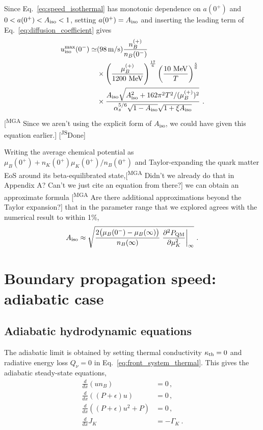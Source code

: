 \documentclass[10pt,superscriptaddress,
amsmath,aps,prc,twocolumn,nofootinbib,floatfix]{revtex4-1}
\newcommand{\mga}[1]{{\color[rgb]{0.6,0,0}#1}}
\newcommand{\mgacom}[1]{\textsf{\color[rgb]{0.8,0,0}[\textsuperscript{MGA} #1]}}
\newcommand{\JS}[1]{{\color{violet}#1}}
\newcommand{\JScom}[1]{\textsf{\color{violet} [\textsuperscript{JS}#1]}}
\newcommand{\eps}{\epsilon}
\begin{document}
\JS{Since Eq.~\eqref{eq:speed_isothermal} has monotonic dependence on $a(0^+)$ and $0<a(0^+)<A_{\rm iso}<1$, setting $a(0^+)=A_{\rm iso}$ and inserting the leading term of Eq.~\eqref{eq:diffusion_coefficient} gives}
\begin{equation}
\begin{aligned}
u^{\max}_{\rm iso}(0^-)\simeq&(98\, {\rm m/s})
\frac{n_B^{(+)}}{n_B(0^-)}\\
&\times\left(\frac{\mu_B^{(+)}}{1200\ {\rm MeV}}\right)^\frac{17}{6}
\left(\frac{10\ {\rm MeV}}{T}\right)^\frac{5}{6}\\
&\times\frac{A_{\rm iso}\sqrt{A_{\rm iso}^2+162\pi^2T^2/(\mu_B^{(+)})^2}}
{\alpha_s^{5/6}\sqrt{1-A_{\rm iso}}\sqrt{1+\xi A_{\rm iso}}}\ .
\end{aligned}
\label{eq:isothermal_speed_scaling}
\end{equation}
%
\mgacom{Since we aren't using the explicit form of $A_\text{iso}$, we could have given this equation earlier.}\JScom{Done}

\mga{Writing the average chemical potential as $\mu_B(0^+) + n_K(0^+)\mu_K(0^+)/n_B(0^+)$ and} Taylor-expanding the quark matter EoS around its beta-equilibrated state,\mgacom{Didn't we already do that in Appendix A? Can't we just cite an equation from there?} we can obtain an approximate formula \mgacom{Are there additional approximations beyond the Taylor expansion?} that in the parameter range that we explored agrees with the numerical result to within 1\%,
\begin{equation}
A_{\rm iso} \approx \sqrt{ \dfrac{2 \bigl(\mu_B(0^-) - \mu_B(\infty)\bigr)}{n_B(\infty)}\left. \dfrac{\partial^2 P_\text{QM}}{\partial\mu_K^2}\right|_{\infty}} \ .
\label{eq:a0plus_max}
\end{equation}

\section{Boundary propagation speed: adiabatic case}
\label{sec:speed-adiabatic}


\subsection{Adiabatic hydrodynamic equations}
\label{sec:hydro-equations}

\mga{The adiabatic limit is obtained by}
setting thermal conductivity $\kappa_{\rm th}=0$ and radiative energy loss $Q_\nu=0$ in Eq.~\eqref{eq:front_system_thermal}. This gives the adiabatic steady-state  equations,
%
\begin{subequations}\label{eq:front_system}
\begin{align}
\frac{d}{dx}(u n_B)&= 0\,,
\label{eq:baryon_conservation}\\
\frac{d}{dx}((P+\eps) u) &=0\,,
\label{eq:energy_conservation}\\
 \frac{d}{dx}((P+\eps) u^2+P)&=0\,,
 \label{eq:momentum_conservation}\\
 \frac{d}{dx}J_K &= -\Gamma_K\ .
    \label{eq:K_conservation}
\end{align}
\end{subequations}
%
\end{document}
